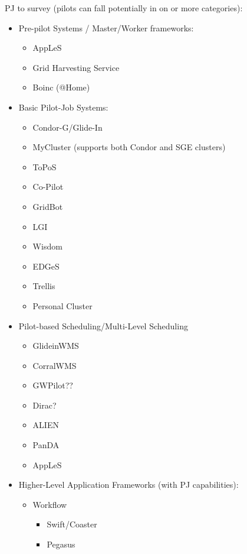 \documentclass{sig-alternate}
\begin{document}
PJ to survey (pilots can fall potentially in on or more categories):
\begin{itemize}
	\item Pre-pilot Systems / Master/Worker frameworks:
	\begin{itemize}
		\item AppLeS
		\item Grid Harvesting Service
		\item Boinc (@Home)
	\end{itemize}
	\item Basic Pilot-Job Systems: 
	\begin{itemize}
		\item Condor-G/Glide-In
		\item MyCluster (supports both Condor and SGE clusters)
		\item ToPoS 
		\item Co-Pilot
		\item GridBot~\cite{Silberstein:2009:GEB:1654059.1654071}
		\item LGI
		\item Wisdom
		\item EDGeS
		\item Trellis
		\item Personal Cluster
	\end{itemize}
	\item Pilot-based Scheduling/Multi-Level Scheduling
	\begin{itemize}
		\item GlideinWMS~\cite{1742-6596-119-6-062044}
		\item CorralWMS
		\item GWPilot??~\cite{gridway} 
		\item Dirac?
        \item ALIEN
		\item PanDA  
		\item AppLeS
	\end{itemize}
	\item Higher-Level Application Frameworks (with PJ capabilities):
	\begin{itemize}
		\item Workflow
		\begin{itemize}
			\item Swift/Coaster
			\item Pegasus

\end{itemize}
\end{itemize}
\end{itemize}
\end{document}
